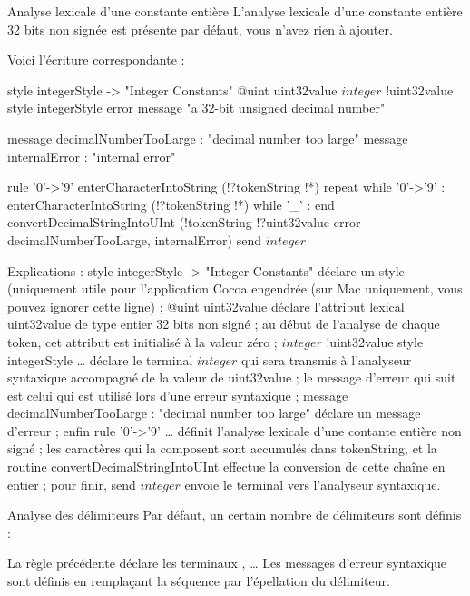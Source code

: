 Analyse lexicale d'une constante entière
L’analyse lexicale d’une constante entière 32 bits non signée est présente par défaut, vous n’avez rien à ajouter.

Voici l'écriture correspondante :
\begin{galgascode}
style integerStyle -> "Integer Constants"
@uint uint32value
$integer$ !uint32value style integerStyle error message "a 32-bit unsigned decimal number"

message decimalNumberTooLarge : "decimal number too large"
message internalError : "internal error"

rule '0'->'9' {
  enterCharacterIntoString (!?tokenString !*)
  repeat
  while '0'->'9' :
    enterCharacterIntoString (!?tokenString !*)
  while '_' :
  end
  convertDecimalStringIntoUInt (!tokenString !?uint32value error decimalNumberTooLarge, internalError)
  send $integer$
}
\end{galgascode}


Explications :
style integerStyle -> "Integer Constants" déclare un style (uniquement utile pour l’application Cocoa engendrée (sur Mac uniquement, vous pouvez ignorer cette ligne) ;
@uint uint32value déclare l’attribut lexical uint32value de type entier 32 bits non signé ; au début de l’analyse de chaque token, cet attribut est initialisé à la valeur zéro ;
$integer$ !uint32value style integerStyle … déclare le terminal $integer$ qui sera transmis à l’analyseur syntaxique accompagné de la valeur de uint32value ;  le message d’erreur qui suit est celui qui est utilisé lors d’une erreur syntaxique ;
message decimalNumberTooLarge : "decimal number too large" déclare un message d’erreur ;
enfin rule '0'->'9' … définit l’analyse lexicale d’une contante entière non signé ; les caractères qui la composent sont accumulés dans tokenString, et la routine convertDecimalStringIntoUInt effectue la conversion de cette chaîne en entier ; pour finir, send $integer$ envoie le terminal vers l’analyseur syntaxique.

Analyse des délimiteurs
Par défaut, un certain nombre de délimiteurs sont définis :


La règle précédente déclare les terminaux \galgas{\$:\$}, \galgas{\$,\$}… Les messages d'erreur syntaxique sont définis en remplaçant la séquence  par l’épellation du délimiteur.

